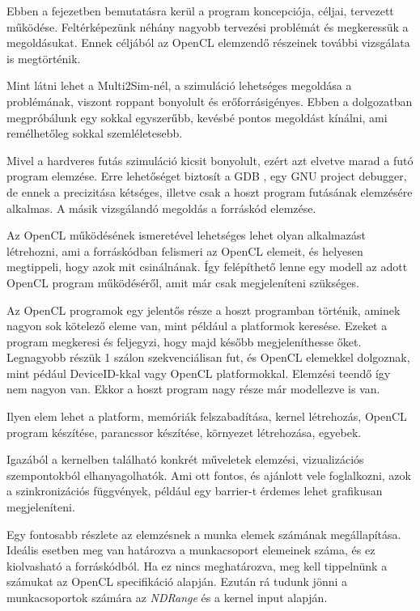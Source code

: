 
Ebben a fejezetben bemutatásra kerül a program koncepciója, céljai, tervezett működése. Feltérképezünk néhány nagyobb tervezési problémát és megkeressük a megoldásukat. Ennek céljából az OpenCL elemzendő részeinek további vizsgálata is megtörténik.

Mint látni lehet a Multi2Sim-nél, a szimuláció lehetséges megoldása a problémának, viszont roppant bonyolult és erőforrásigényes. Ebben a dolgozatban megpróbálunk egy sokkal egyszerűbb, kevésbé pontos megoldást kínálni, ami remélhetőleg sokkal szemléletesebb. 

Mivel a hardveres futás szimuláció kicsit bonyolult, ezért azt elvetve marad a futó program elemzése. Erre lehetőséget biztosít a GDB \cite{gdb}, egy GNU project debugger, de ennek a precizitása kétséges, illetve csak a hoszt program futásának elemzésére alkalmas. A másik vizsgálandó megoldás a forráskód elemzése.

Az OpenCL működésének ismeretével lehetséges lehet olyan alkalmazást létrehozni, ami a forráskódban felismeri az OpenCL elemeit, és helyesen megtippeli, hogy azok mit csinálnának. Így felépíthető lenne egy modell az adott OpenCL program működéséről, amit már csak megjeleníteni szükséges.
 
Az OpenCL programok egy jelentős része a hoszt programban történik, aminek nagyon sok kötelező eleme van, mint például a platformok keresése. Ezeket a program megkeresi és feljegyzi, hogy majd később megjeleníthesse őket. Legnagyobb részük 1 szálon szekvenciálisan fut, és OpenCL elemekkel dolgoznak, mint pédául DeviceID-kkal vagy OpenCL platformokkal. Elemzési teendő így nem nagyon van. Ekkor a hoszt program nagy része már modellezve is van.

Ilyen elem lehet a platform, memóriák felszabadítása, kernel létrehozás, OpenCL program készítése, parancssor készítése, környezet létrehozása, egyebek.



Igazából a kernelben található konkrét műveletek elemzési, vizualizációs szempontokból elhanyagolhatók. Ami ott fontos, és ajánlott vele foglalkozni, azok a szinkronizációs függvények, például egy barrier-t érdemes lehet grafikusan megjeleníteni.

Egy fontosabb részlete az elemzésnek a munka elemek számának megállapítása. Ideális esetben meg van határozva a munkacsoport elemeinek száma, és ez kiolvasható a forráskódból. Ha ez nincs meghatározva, meg kell tippelnünk a számukat az OpenCL specifikáció alapján. Ezután rá tudunk jönni a munkacsoportok számára az \textit{NDRange} és a kernel input alapján.

